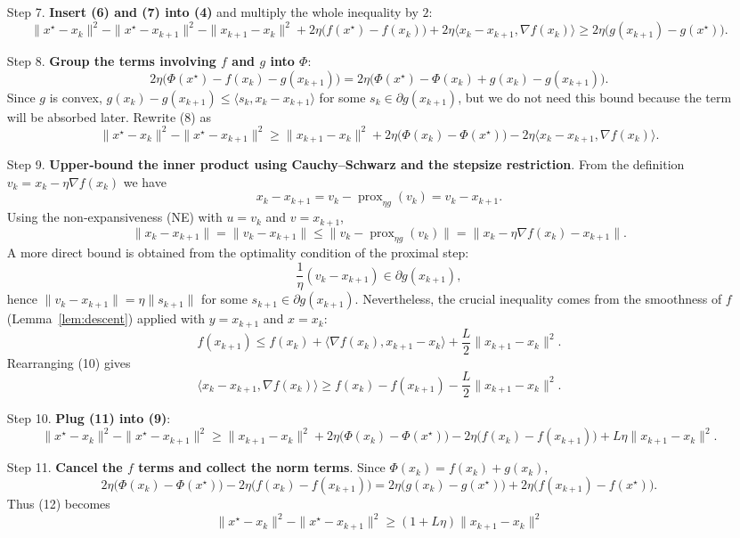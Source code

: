 \documentclass{article}
\newcommand{\prox}{\operatorname{prox}}
\newcommand{\grad}{\nabla}
\begin{document}
\begin{enumerate}
\[\tag{7}
\]
\item[Step 7.] \textbf{Insert (6) and (7) into (4)} and multiply the whole inequality by $2$:
\[
\|x^\star-x_k\|^2-\|x^\star-x_{k+1}\|^2-\|x_{k+1}-x_k\|^2
+2\eta\big(f(x^\star)-f(x_k)\big)
+2\eta\langle x_k-x_{k+1},\grad f(x_k)\rangle
\ge 2\eta\big(g(x_{k+1})-g(x^\star)\big).\tag{8}
\]
\item[Step 8.] \textbf{Group the terms involving $f$ and $g$ into $\Phi$}:
\[
2\eta\big(\Phi(x^\star)-f(x_k)-g(x_{k+1})\big)
=2\eta\big(\Phi(x^\star)-\Phi(x_k)+g(x_k)-g(x_{k+1})\big).
\]
Since $g$ is convex, $g(x_k)-g(x_{k+1})\le\langle s_k, x_k-x_{k+1}\rangle$ for some $s_k\in\partial g(x_{k+1})$,
but we do not need this bound because the term will be absorbed later.  
Rewrite (8) as
\[
\|x^\star-x_k\|^2-\|x^\star-x_{k+1}\|^2
\ge \|x_{k+1}-x_k\|^2
+2\eta\big(\Phi(x_k)-\Phi(x^\star)\big)
-2\eta\langle x_k-x_{k+1},\grad f(x_k)\rangle .
\tag{9}
\]
\item[Step 9.] \textbf{Upper‑bound the inner product using Cauchy–Schwarz and the stepsize restriction}.  
From the definition $v_k=x_k-\eta\grad f(x_k)$ we have
\[
x_k-x_{k+1}=v_k-\prox_{\eta g}(v_k)=v_k-x_{k+1}.
\]
Using the non‑expansiveness (NE) with $u=v_k$ and $v=x_{k+1}$,
\[
\|x_k-x_{k+1}\| = \|v_k-x_{k+1}\|\le\|v_k-\prox_{\eta g}(v_k)\| = \|x_k-\eta\grad f(x_k)-x_{k+1}\|.
\]
A more direct bound is obtained from the optimality condition of the proximal step:
\[
\frac{1}{\eta}(v_k-x_{k+1})\in\partial g(x_{k+1}),
\]
hence $\|v_k-x_{k+1}\| = \eta\|s_{k+1}\|$ for some $s_{k+1}\in\partial g(x_{k+1})$.
Nevertheless, the crucial inequality comes from the smoothness of $f$ (Lemma~\ref{lem:descent}) applied with $y=x_{k+1}$ and $x=x_k$:
\[
f(x_{k+1})\le f(x_k)+\langle\grad f(x_k),x_{k+1}-x_k\rangle+\frac{L}{2}\|x_{k+1}-x_k\|^2 .
\tag{10}
\]
Rearranging (10) gives
\[
\langle x_k-x_{k+1},\grad f(x_k)\rangle
\ge f(x_k)-f(x_{k+1})-\frac{L}{2}\|x_{k+1}-x_k\|^2 .
\tag{11}
\]
\item[Step 10.] \textbf{Plug (11) into (9)}:
\[
\|x^\star-x_k\|^2-\|x^\star-x_{k+1}\|^2
\ge \|x_{k+1}-x_k\|^2
+2\eta\big(\Phi(x_k)-\Phi(x^\star)\big)
-2\eta\big(f(x_k)-f(x_{k+1})\big)
+L\eta\|x_{k+1}-x_k\|^2 .
\tag{12}
\]
\item[Step 11.] \textbf{Cancel the $f$ terms and collect the norm terms}.  
Since $\Phi(x_k)=f(x_k)+g(x_k)$,
\[
2\eta\big(\Phi(x_k)-\Phi(x^\star)\big)-2\eta\big(f(x_k)-f(x_{k+1})\big)
=2\eta\big(g(x_k)-g(x^\star)\big)+2\eta\big(f(x_{k+1})-f(x^\star)\big).
\]
Thus (12) becomes
\[
\|x^\star-x_k\|^2-\|x^\star-x_{k+1}\|^2
\ge (1+L\eta)\|x_{k+1}-x_k\|^2
\]
\end{enumerate}
\end{document}
